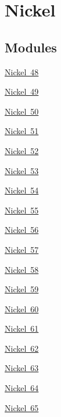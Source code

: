 \hypertarget{group___isotope_const-_nickel}{}\section{Nickel}
\label{group___isotope_const-_nickel}
\subsection*{Modules}
\begin{DoxyCompactItemize}
\item 
\mbox{\hyperlink{group___isotope_const-_nickel-_ni48}{Nickel 48}}
\item 
\mbox{\hyperlink{group___isotope_const-_nickel-_ni49}{Nickel 49}}
\item 
\mbox{\hyperlink{group___isotope_const-_nickel-_ni50}{Nickel 50}}
\item 
\mbox{\hyperlink{group___isotope_const-_nickel-_ni51}{Nickel 51}}
\item 
\mbox{\hyperlink{group___isotope_const-_nickel-_ni52}{Nickel 52}}
\item 
\mbox{\hyperlink{group___isotope_const-_nickel-_ni53}{Nickel 53}}
\item 
\mbox{\hyperlink{group___isotope_const-_nickel-_ni54}{Nickel 54}}
\item 
\mbox{\hyperlink{group___isotope_const-_nickel-_ni55}{Nickel 55}}
\item 
\mbox{\hyperlink{group___isotope_const-_nickel-_ni56}{Nickel 56}}
\item 
\mbox{\hyperlink{group___isotope_const-_nickel-_ni57}{Nickel 57}}
\item 
\mbox{\hyperlink{group___isotope_const-_nickel-_ni58}{Nickel 58}}
\item 
\mbox{\hyperlink{group___isotope_const-_nickel-_ni59}{Nickel 59}}
\item 
\mbox{\hyperlink{group___isotope_const-_nickel-_ni60}{Nickel 60}}
\item 
\mbox{\hyperlink{group___isotope_const-_nickel-_ni61}{Nickel 61}}
\item 
\mbox{\hyperlink{group___isotope_const-_nickel-_ni62}{Nickel 62}}
\item 
\mbox{\hyperlink{group___isotope_const-_nickel-_ni63}{Nickel 63}}
\item 
\mbox{\hyperlink{group___isotope_const-_nickel-_ni64}{Nickel 64}}
\item 
\mbox{\hyperlink{group___isotope_const-_nickel-_ni65}{Nickel 65}}
\item 

\end{DoxyCompactItemize}
